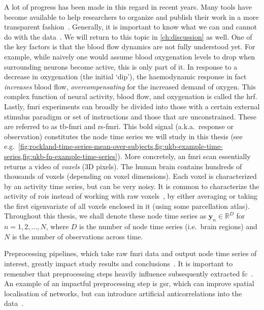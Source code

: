 A lot of progress has been made in this regard in recent years.
Many tools have become available to help researchers to organize and publish their work in a more transparent fashion~\parencite{Marcus2011, Kumar2022, Niso2022}.
Generally, it is important to know what we can and cannot do with the data~\parencite{Logothetis2008}.
We will return to this topic in \cref{ch:discussion} as well.
%
One of the key factors is that the blood flow dynamics are not fully understood yet.
For example, while naively one would assume blood oxygenation levels to drop when surrounding neurons become active, this is only part of it.
In response to a decrease in oxygenation (the initial `dip'), the haemodynamic response in fact \emph{increases} blood flow, \emph{overcompensating} for the increased demand of oxygen.
This complex function of neural activity, blood flow, and oxygenation is called the \gls{hrf}.
%
Lastly, \gls{fmri} experiments can broadly be divided into those with a certain external stimulus paradigm or set of instructions and those that are unconstrained.
These are referred to as \gls{tb-fmri} and \gls{rs-fmri}.
%
This \gls{bold} signal (a.k.a.~response or observation) constitutes the node time series we will study in this thesis (see e.g.~\cref{fig:rockland-time-series-mean-over-subjects,fig:ukb-example-time-series,fig:ukb-fn-example-time-series}).
More concretely, an \gls{fmri} scan essentially returns a video of \emph{voxels} (3D pixels).
The human brain contains hundreds of thousands of voxels (depending on voxel dimensions).
Each voxel is characterized by an activity time series, but can be very noisy.
It is common to characterize the activity of \glspl{roi} instead of working with raw voxels~\parencite{Korhonen2017}, by either averaging or taking the first eigenvariate of all voxels enclosed in it (using some parcellation atlas).
Throughout this thesis, we shall denote these node time series as $\mathbf{y}_n \in \mathbb{R}^D$ for $n = 1, 2, \ldots , N$, where $D$ is the number of node time series (i.e.~brain regions) and $N$ is the number of observations across time.

Preprocessing pipelines, which take raw \gls{fmri} data and output node time series of interest, greatly impact study results and conclusions~\parencite{Caballero-Gaudes2017}.
It is important to remember that preprocessing steps heavily influence subsequently extracted \gls{fc}~\parencite{Aquino2022}.
An example of an impactful preprocessing step is \gls{gsr}, which can improve spatial localisation of networks, but can introduce artificial anticorrelations into the data~\parencite{Murphy2009}.

